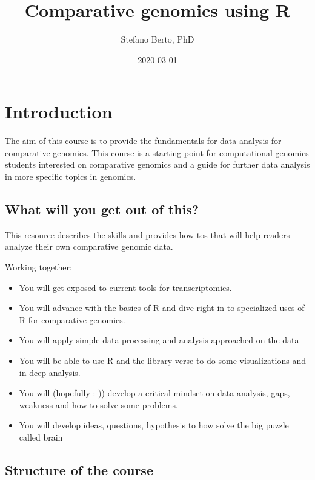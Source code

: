 \documentclass[]{book}
\title{Comparative genomics using R}
\author{Stefano Berto, PhD}
\date{2020-03-01}
\begin{document}
\maketitle

{
\hypersetup{linkcolor=black}
\setcounter{tocdepth}{1}
\tableofcontents
}
\hypertarget{introduction}{%
\chapter*{Introduction}\label{introduction}}

The aim of this course is to provide the fundamentals for data analysis for comparative genomics. This course is a starting point for computational genomics students interested on comparative genomics and a guide for further data analysis in more specific topics in genomics.

\hypertarget{what-will-you-get-out-of-this}{%
\section*{What will you get out of this?}\label{what-will-you-get-out-of-this}}

This resource describes the skills and provides how-tos that will help readers
analyze their own comparative genomic data.

Working together:

\begin{itemize}
\item
  You will get exposed to current tools for transcriptomics.
\item
  You will advance with the basics of R and dive right in to specialized uses of R for comparative genomics.
\item
  You will apply simple data processing and analysis approached on the data
\item
  You will be able to use R and the library-verse to do some visualizations and in deep analysis.
\item
  You will (hopefully :-)) develop a critical mindset on data analysis, gaps, weakness and how to solve some problems.
\item
  You will develop ideas, questions, hypothesis to how solve the big puzzle called brain
\end{itemize}

\hypertarget{structure-of-the-course}{%
\section*{Structure of the course}\label{structure-of-the-course}}
\end{document}
